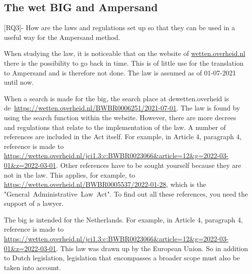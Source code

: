 \def\rq{RQ3}

\begin{comment}
RQ3 - Hoe zijn de wet- en regelgeving opgezet zodat ze kunnen worden gebruikt in een bruikbare manier voor de Ampersand-methode.
\end{comment}
\subsection{The wet BIG and Ampersand}
[RQ3]- How are the laws and regulations set up so that they can be used in a useful way for the Ampersand method.

When studying the law, it is noticeable that on the website of \url{wetten.overheid.nl} there is the possibility to go back in time.
This is of little use for the translation to Ampersand and is therefore not done.
The law is assumed as of 01-07-2021 until now.

When a search is made for the \acrshort{big}, the search place at dewetten.overheid is de~\url{https://wetten.overheid.nl/BWBR0006251/2021-07-01}.
The law is found by using the search function within the website.
However, there are more decrees and regulations that relate to the implementation of the law.
A number of references are included in the Act itself.
For example, in Article 4, paragraph 4, reference is made to \url{https://wetten.overheid.nl/jci1.3:c:BWBR0023066&article=12&g=2022-03-01&z=2022-03-01}.
Other references have to be sought yourself because they are not in the law.
This applies, for example, to \url{https://wetten.overheid.nl/BWBR0005537/2022-01-28}, which is the \mbox{"General Administrative Law Act"}.
To find out all these references, you need the support of a lawyer.

The \acrshort{big} is intended for the Netherlands.
For example, in Article 4, paragraph 4, reference is made to \url{https://wetten.overheid.nl/jci1.3:c:BWBR0023066&article=12&g=2022-03-01&z=2022-03-01}.
This law was drawn up by the European Union.
So in addition to Dutch legislation, legislation that encompasses a broader scope must also be taken into account.


